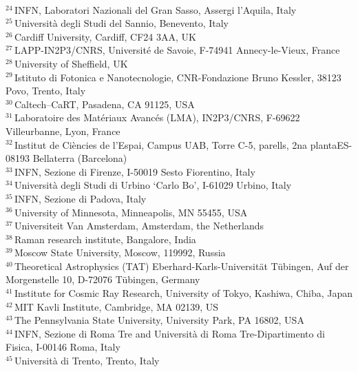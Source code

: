 {\\{$^{24}$\,INFN, Laboratori Nazionali del Gran Sasso, Assergi l'Aquila, Italy}
\\{$^{25}$\,Universit\`{a} degli Studi del Sannio, Benevento, Italy}
\\{$^{26}$\,Cardiff University, Cardiff, CF24 3AA, UK}
\\{$^{27}$\,LAPP-IN2P3/CNRS, Universit\'{e} de Savoie, F-74941 Annecy-le-Vieux, France}
\\{$^{28}$\,University of Sheffield, UK}
\\{$^{29}$\,Istituto di Fotonica e Nanotecnologie, CNR-Fondazione Bruno Kessler, 38123 Povo, Trento, Italy}
\\{$^{30}$\,Caltech--CaRT, Pasadena, CA 91125, USA}
\\{$^{31}$\,Laboratoire des Mat\'{e}riaux Avanc\'{e}s (LMA), IN2P3/CNRS, F-69622 Villeurbanne, Lyon, France}
\\{$^{32}$\,Institut de Ciències de l'Espai, Campus UAB, Torre C-5, parells, 2na plantaES-08193 Bellaterra (Barcelona) }
\\{$^{33}$\,INFN, Sezione di Firenze, I-50019 Sesto Fiorentino, Italy}
\\{$^{34}$\,Universit\`{a} degli Studi di Urbino \textquoteleft Carlo Bo\textquoteright, I-61029 Urbino, Italy}
\\{$^{35}$\,INFN, Sezione di Padova, Italy}
\\{$^{36}$\,University of Minnesota, Minneapolis, MN 55455, USA}
\\{$^{37}$\,Universiteit Van Amsterdam, Amsterdam, the Netherlands}
\\{$^{38}$\,Raman research institute, Bangalore, India}
\\{$^{39}$\,Moscow State University, Moscow, 119992, Russia}
\\{$^{40}$\,Theoretical Astrophysics (TAT) Eberhard-Karls-Universit\"at T\"ubingen, Auf der Morgenstelle 10, D-72076 T\"{u}bingen, Germany}
\\{$^{41}$\,Institute for Cosmic Ray Research, University of Tokyo, Kashiwa, Chiba, Japan}
\\{$^{42}$\,MIT Kavli Institute, Cambridge, MA 02139, US}
\\{$^{43}$\,The Pennsylvania State University, University Park, PA 16802, USA}
\\{$^{44}$\,INFN, Sezione di Roma Tre and Universit\`{a} di Roma Tre-Dipartimento di Fisica, I-00146 Roma, Italy}
\\{$^{45}$\,Universit\`{a} di Trento, Trento, Italy}
}
